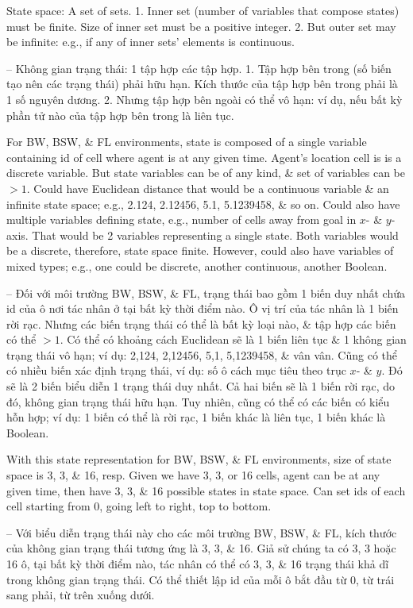 \documentclass{article}
\begin{document}
\begin{itemize}
\begin{itemize}
        {\sf State space: A set of sets.} 1. Inner set (number of variables that compose states) must be finite. Size of inner set must be a positive integer. 2. But outer set may be infinite: e.g., if any of inner sets' elements is continuous.

        -- {\sf Không gian trạng thái: 1 tập hợp các tập hợp.} 1. Tập hợp bên trong (số biến tạo nên các trạng thái) phải hữu hạn. Kích thước của tập hợp bên trong phải là 1 số nguyên dương. 2. Nhưng tập hợp bên ngoài có thể vô hạn: ví dụ, nếu bất kỳ phần tử nào của tập hợp bên trong là liên tục.

        For BW, BSW, \& FL environments, state is composed of a single variable containing id of cell where agent is at any given time. Agent's location cell is is a discrete variable. But state variables can be of any kind, \& set of variables can be $> 1$. Could have Euclidean distance that would be a continuous variable \& an infinite state space; e.g., 2.124, 2.12456, 5.1, 5.1239458, \& so on. Could also have multiple variables defining state, e.g., number of cells away from goal in $x$- \& $y$-axis. That would be 2 variables representing a single state. Both variables would be a discrete, therefore, state space finite. However, could also have variables of mixed types; e.g., one could be discrete, another continuous, another Boolean.

        -- Đối với môi trường BW, BSW, \& FL, trạng thái bao gồm 1 biến duy nhất chứa id của ô nơi tác nhân ở tại bất kỳ thời điểm nào. Ô vị trí của tác nhân là 1 biến rời rạc. Nhưng các biến trạng thái có thể là bất kỳ loại nào, \& tập hợp các biến có thể $> 1$. Có thể có khoảng cách Euclidean sẽ là 1 biến liên tục \& 1 không gian trạng thái vô hạn; ví dụ: 2,124, 2,12456, 5,1, 5,1239458, \& vân vân. Cũng có thể có nhiều biến xác định trạng thái, ví dụ: số ô cách mục tiêu theo trục $x$- \& $y$. Đó sẽ là 2 biến biểu diễn 1 trạng thái duy nhất. Cả hai biến sẽ là 1 biến rời rạc, do đó, không gian trạng thái hữu hạn. Tuy nhiên, cũng có thể có các biến có kiểu hỗn hợp; ví dụ: 1 biến có thể là rời rạc, 1 biến khác là liên tục, 1 biến khác là Boolean.

        With this state representation for BW, BSW, \& FL environments, size of state space is 3, 3, \& 16, resp. Given we have 3, 3, or 16 cells, agent can be at any given time, then have 3, 3, \& 16 possible states in state space. Can set ids of each cell starting from 0, going left to right, top to bottom.

        -- Với biểu diễn trạng thái này cho các môi trường BW, BSW, \& FL, kích thước của không gian trạng thái tương ứng là 3, 3, \& 16. Giả sử chúng ta có 3, 3 hoặc 16 ô, tại bất kỳ thời điểm nào, tác nhân có thể có 3, 3, \& 16 trạng thái khả dĩ trong không gian trạng thái. Có thể thiết lập id của mỗi ô bắt đầu từ 0, từ trái sang phải, từ trên xuống dưới.


\end{itemize}
\end{itemize}
\end{document}
